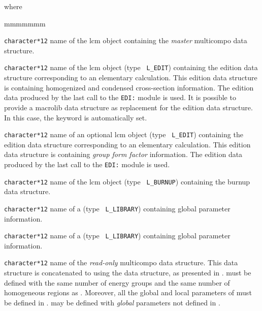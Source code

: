 \noindent where
\begin{ListeDeDescription}{mmmmmmm}

\item[\dusa{CPONAM}] {\tt character*12} name of the {\sc lcm} object containing the
{\sl master} {\sc multicompo} data structure.

\item[\dusa{EDINAM}] {\tt character*12} name of the {\sc lcm} object (type {\tt
L\_EDIT}) containing the {\sc edition} data structure corresponding to an elementary
calculation. This {\sc edition} data structure is containing homogenized and
condensed cross-section information. The {\sc edition} data produced by the last call
to the {\tt EDI:} module is used. It is possible to provide a {\sc macrolib} data structure
as replacement for the {\sc edition} data structure. In this case, the  keyword
is automatically set.

\item[\dusa{EDINA2}] {\tt character*12} name of an optional {\sc lcm} object (type {\tt
L\_EDIT}) containing the {\sc edition} data structure corresponding to an elementary
calculation. This {\sc edition} data structure is containing {\sl group form factor}
information. The {\sc edition} data produced by the last call to the {\tt EDI:} module
is used.

\item[\dusa{BRNNAM}] {\tt character*12} name of the {\sc lcm} object (type {\tt
L\_BURNUP}) containing the {\sc burnup} data structure.

\item[\dusa{HMIC1}] {\tt character*12} name of a  (type {\tt
L\_LIBRARY}) containing global parameter information.

\item[\dusa{HMIC2}] {\tt character*12} name of a  (type {\tt
L\_LIBRARY}) containing global parameter information.

\item[\dusa{CPORHS}] {\tt character*12} name of the {\sl read-only} {\sc multicompo} data structure. This
data structure is concatenated to  using the  data structure,
as presented in .  must be defined with the same number of energy
groups and the same number of homogeneous regions as . Moreover, all the
global and local parameters of  must be defined in . 
may be defined with {\sl global} parameters not defined in .


\end{ListeDeDescription}
